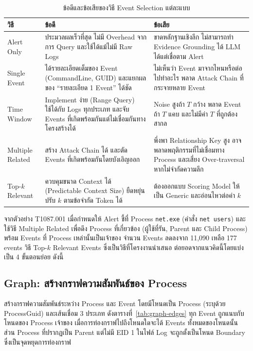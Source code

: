 \begin{table}[ht]
  \centering
  \caption{ข้อดีและข้อเสียของวิธี Event Selection แต่ละแบบ}
  \label{tab:es-methods}
  \begin{tabular}{|L{0.16\textwidth}|L{0.36\textwidth}|L{0.36\textwidth}|}
    \hline
    \textbf{วิธี} & \textbf{ข้อดี} & \textbf{ข้อเสีย} \\ \hline
    Alert Only &
      ประมวลผลเร็วที่สุด ไม่มี Overhead จากการ Query และใช้ได้แม้ไม่มี Raw Logs &
      ขาดหลักฐานเชิงลึก ไม่สามารถทำ Evidence Grounding ได้ LLM ได้แต่เชื่อตาม Alert \\ \hline
    Single Event &
      ได้รายละเอียดเต็มของ Event (CommandLine, GUID) และแยกผลของ ``รายละเอียด 1 Event'' ได้ชัด &
      ไม่เห็นว่า Event มาจากไหนหรือต่อไปทำอะไร พลาด Attack Chain ที่กระจายหลาย Event \\ \hline
    Time Window &
      Implement ง่าย (Range Query) ใช้ได้กับ Logs ทุกประเภท และจับ Events ที่เกิดพร้อมกันแต่ไม่เชื่อมกันทางโครงสร้างได้ &
      Noise สูงถ้า $T$ กว้าง พลาด Event ถ้า $T$ แคบ และไม่มีค่า $T$ ที่ถูกต้องสากล \\ \hline
    Multiple Related &
      สร้าง Attack Chain ได้ และตัด Events ที่เกิดพร้อมกันโดยบังเอิญออก &
      พึ่งพา Relationship Key สูง อาจพลาดพฤติกรรมที่ไม่เชื่อมทาง Process และเสี่ยง Over-traversal หากไม่จำกัดความลึก \\ \hline
    Top-$k$ Relevant &
      ควบคุมขนาด Context ได้ (Predictable Context Size) ยืดหยุ่น ปรับ $k$ ตามข้อจำกัด Token ได้ &
      ต้องออกแบบ Scoring Model ให้เป็น Generic และอ่อนไหวต่อค่า $k$ \\ \hline
  \end{tabular}
\end{table}

จากตัวอย่าง T1087.001 เมื่อกำหนดให้ Alert ชี้ที่ Process \texttt{net.exe} (คำสั่ง \texttt{net users})
และใช้วิธี Multiple Related เพื่อดึง Process ที่เกี่ยวข้อง (ผู้ใช้ที่รัน, Parent และ Child Process)
พร้อม Events ที่ Process เหล่านั้นเป็นเจ้าของ จำนวน Events ลดลงจาก 11,090 เหลือ 177 events
วิธี Top-$k$ Relevant Events ซึ่งเป็นวิธีที่โครงงานนำเสนอ ต่อยอดจากแนวคิดนี้โดยแบ่งเป็น 4 ขั้นตอนย่อย ดังนี้

\subsection{Graph: สร้างกราฟความสัมพันธ์ของ Process}
สร้างกราฟความสัมพันธ์ระหว่าง Process และ Event โดยมีโหนดเป็น Process (ระบุด้วย ProcessGuid)
และเส้นเชื่อม 3 ประเภท ดังตารางที่~\ref{tab:graph-edges}
ทุก Event ถูกแนบกับโหนดของ Process เจ้าของ เมื่อการท่องกราฟไปถึงโหนดใดจะได้ Events ทั้งหมดของโหนดนั้น
ส่วน Process ที่ปรากฏเป็น Parent แต่ไม่มี EID 1 ในไฟล์ Log จะถูกตั้งเป็นโหนด Boundary ซึ่งเป็นจุดหยุดการท่องกราฟ

